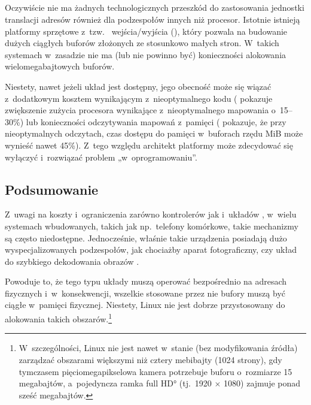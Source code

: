 \subsection{}

Oczywiście nie ma żadnych technologicznych przeszkód do zastosowania
jednostki translacji adresów również dla podzespołów innych niż
procesor.  Istotnie istnieją platformy sprzętowe z~tzw.\ 
wejścia/wyjścia (), który pozwala na budowanie dużych ciągłych
buforów złożonych ze stosunkowo małych stron.  W~takich systemach
w~zasadzie nie ma (lub nie powinno być) konieczności alokowania
wielomegabajtowych buforów.

Niestety, nawet jeżeli układ  jest dostępny, jego obecność może
się wiązać z~dodatkowym kosztem wynikającym z~nieoptymalnego kodu
(\textcite{bib:price-of-safety} pokazuje zwiększenie zużycia procesora
wynikające z~nieoptymalnego mapowania o~15--30\%) lub konieczności
odczytywania mapowań z~pamięci
(\textcite{bib:mitigate-iotlb-bottleneck} pokazuje, że przy
nieoptymalnych odczytach, czas dostępu do pamięci w~buforach rzędu
\unit[1]{MiB} może wynieść nawet 45\%).  Z~tego względu architekt
platformy może zdecydować się wyłączyć  i~rozwiązać problem
„w~oprogramowaniu”.

\subsection{Podsumowanie}

Z~uwagi na koszty i~ograniczenia zarówno kontrolerów  jak i~układów
, w~wielu systemach wbudowanych, takich jak np.\ telefony
komórkowe, takie mechanizmy są często niedostępne.  Jednocześnie,
właśnie takie urządzenia posiadają dużo wyspecjalizowanych
podzespołów, jak chociażby aparat fotograficzny, czy układ do
szybkiego dekodowania obrazów .

Powoduje to, że tego typu układy muszą operować bezpośrednio na
adresach fizycznych i~w~konsekwencji, wszelkie stosowane przez nie
bufory muszą być ciągłe w~pamięci fizycznej.  Niestety, Linux nie jest
dobrze przystosowany do alokowania takich
obszarów.\footnote{W~szczególności, Linux nie jest nawet w~stanie (bez
  modyfikowania źródła) zarządzać obszarami większymi niż cztery
  mebibajty (1024 strony), gdy tymczasem pięciomegapikselowa kamera
  potrzebuje buforu o~rozmiarze 15 megabajtów, a~pojedyncza ramka
  \ang*{full HD} (tj.\ 1920 $\times$ 1080) zajmuje ponad sześć
  megabajtów.}


